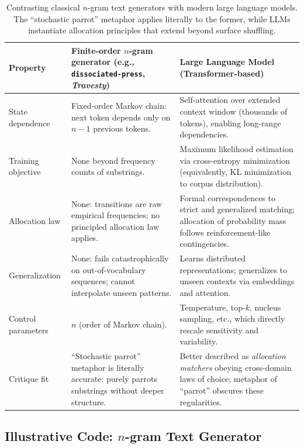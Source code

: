 \documentclass[11pt]{article}
\begin{document}
\begin{table}[ht]
\centering
\begin{tabular}{|p{}|p{}|p{}|}
\hline
\textbf{Property} & \textbf{Finite-order $n$-gram generator (e.g., \texttt{dissociated-press}, \emph{Travesty})} & \textbf{Large Language Model (Transformer-based)} \\
\hline
State dependence &
Fixed-order Markov chain: next token depends only on $n-1$ previous tokens. &
Self-attention over extended context window (thousands of tokens), enabling long-range dependencies. \\
\hline
Training objective &
None beyond frequency counts of substrings. &
Maximum likelihood estimation via cross-entropy minimization (equivalently, KL minimization to corpus distribution). \\
\hline
Allocation law &
None: transitions are raw empirical frequencies; no principled allocation law applies. &
Formal correspondences to strict and generalized matching; allocation of probability mass follows reinforcement-like contingencies. \\
\hline
Generalization &
None: fails catastrophically on out-of-vocabulary sequences; cannot interpolate unseen patterns. &
Learns distributed representations; generalizes to unseen contexts via embeddings and attention. \\
\hline
Control parameters &
$n$ (order of Markov chain). &
Temperature, top-$k$, nucleus sampling, etc., which directly rescale sensitivity and variability. \\
\hline
Critique fit &
``Stochastic parrot'' metaphor is literally accurate: purely parrots substrings without deeper structure. &
Better described as \emph{allocation matchers} obeying cross-domain laws of choice; metaphor of ``parrot'' obscures these regularities. \\
\hline
\end{tabular}
\caption{Contrasting classical $n$-gram text generators with modern large language models. The ``stochastic parrot'' metaphor applies literally to the former, while LLMs instantiate allocation principles that extend beyond surface shuffling.}
\label{tab:ngram_vs_llm}
\end{table}

\subsection*{Illustrative Code: $n$-gram Text Generator}
\end{document}
